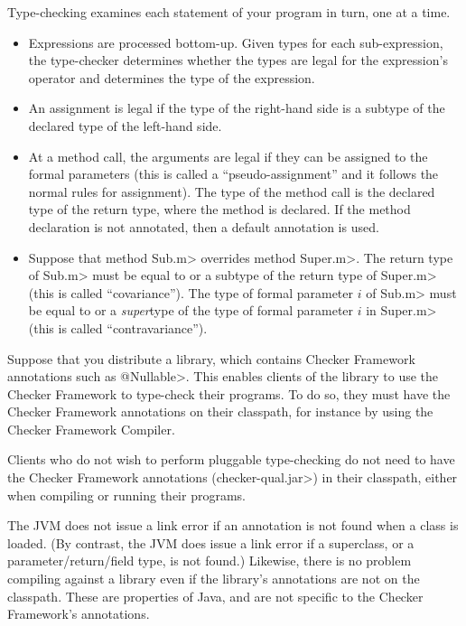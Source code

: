 Type-checking examines each statement of your program in turn, one at a time.
\begin{itemize}
\item
Expressions are processed bottom-up.  Given types for each sub-expression,
the type-checker determines whether the types are legal for the
expression's operator and determines the type of the expression.

\item
An assignment is legal if the type of the right-hand side is a subtype of
the declared type of the left-hand side.

\item
 At a method call, the arguments are legal if they can be assigned to the
 formal parameters (this is called a ``pseudo-assignment'' and it follows
 the normal rules for assignment).  The type of the method call is the
 declared type of the return type, where the method is declared.  If
 the method declaration is not annotated, then a default annotation is
 used.

\item
  Suppose that method \<Sub.m> overrides method \<Super.m>.
  The return type of \<Sub.m> must be equal to or a subtype of the return
  type of \<Super.m> (this is called ``covariance'').
  The type of formal parameter $i$ of \<Sub.m> must be equal to or a
  \emph{super}type of the type of formal parameter $i$ in \<Super.m> (this
  is called ``contravariance'').

\end{itemize}



Suppose that you distribute a library, which contains Checker Framework
annotations such as \<@Nullable>.  This enables clients of the library to
use the Checker Framework to type-check their programs.  To do so, they
must have the Checker Framework annotations on their classpath, for
instance by using the Checker Framework Compiler.

Clients who do not wish to perform pluggable type-checking do not need to
have the Checker Framework annotations
(\<checker-qual.jar>) in their classpath, either when compiling or running
their programs.

The JVM does not issue a link error if an annotation is not found when a
class is loaded.  (By contrast, the JVM does issue a link error if a
superclass, or a parameter/return/field type, is not found.)
Likewise, there is no problem compiling against a library even if the
library's annotations are not on the classpath.
These are properties of Java, and are not specific to the Checker
Framework's annotations.


